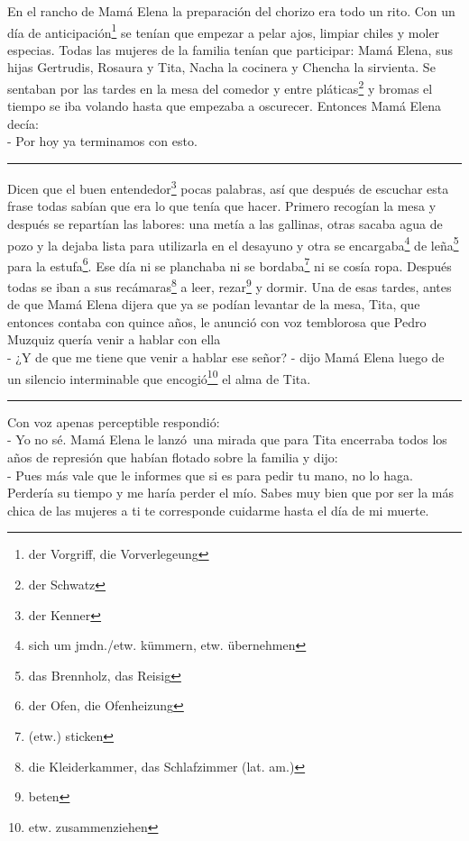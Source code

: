 En el rancho de Mamá Elena la preparación del chorizo era todo un rito.
Con un día de anticipación\footnote{der Vorgriff, die Vorverlegeung}
se tenían que empezar a pelar ajos, limpiar chiles y moler especias.
Todas las mujeres de la familia tenían que participar: Mamá Elena, sus hijas
Gertrudis, Rosaura y Tita, Nacha la cocinera y Chencha la sirvienta. Se
sentaban por las tardes en la mesa del comedor y entre pláticas\footnote{der Schwatz} y bromas el tiempo se iba volando
hasta que empezaba a oscurecer. Entonces Mamá Elena decía:
\\- Por hoy ya terminamos con esto. \\
\rule{1em}{0pt}Dicen que el buen entendedor\footnote{der Kenner}
pocas palabras, así que después de escuchar esta frase todas sabían que
era lo que tenía que hacer. Primero recogían la mesa y después se repartían
las labores: una metía a las gallinas, otras sacaba agua de pozo y la
dejaba lista para utilizarla en el desayuno y otra se encargaba\footnote{sich um jmdn./etw. kümmern, etw. übernehmen}
de leña\footnote{das Brennholz, das Reisig} para la estufa\footnote{der Ofen, die Ofenheizung}. Ese día ni se
planchaba ni se bordaba\footnote{(etw.) sticken} ni se cosía
ropa. Después todas se iban a sus recámaras\footnote{die Kleiderkammer, das Schlafzimmer (lat. am.)}
a leer, rezar\footnote{beten} y dormir. Una de esas tardes, antes de que Mamá
Elena dijera que ya se podían levantar de la mesa, Tita, que entonces
contaba con quince años, le anunció con voz temblorosa que Pedro Muzquiz
quería venir a hablar con ella \ndots
\\- ¿Y de que me tiene que venir a hablar ese señor? - dijo Mamá Elena %
luego de un silencio interminable que encogió\footnote{etw. zusammenziehen} %
el alma de Tita. \\
\rule{1em}{0pt}Con voz apenas perceptible respondió:
\\- Yo no sé. %
Mamá Elena le lanzó~una mirada que para Tita encerraba todos los %
años de represión que habían flotado sobre la familia y dijo: %
\\- Pues más vale que le informes que si es para pedir tu mano, no lo %
haga. Perdería su tiempo y me haría perder el mío. Sabes muy bien que %
por ser la más chica de las mujeres a ti te corresponde cuidarme hasta %
el día de mi muerte.\\

